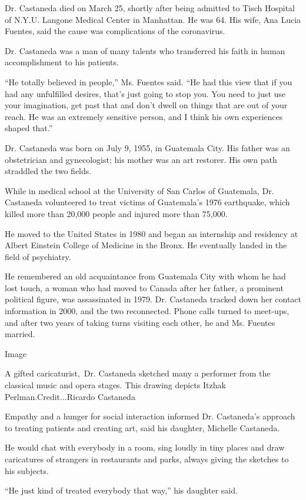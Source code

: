 Dr. Castaneda died on March 25, shortly after being admitted to Tisch
Hospital of N.Y.U. Langone Medical Center in Manhattan. He was 64. His
wife, Ana Lucia Fuentes, said the cause was complications of the
coronavirus.

Dr. Castaneda was a man of many talents who transferred his faith in
human accomplishment to his patients.

``He totally believed in people,'' Ms. Fuentes said. ``He had this view
that if you had any unfulfilled desires, that's just going to stop you.
You need to just use your imagination, get past that and don't dwell on
things that are out of your reach. He was an extremely sensitive person,
and I think his own experiences shaped that.''

Dr. Castaneda was born on July 9, 1955, in Guatemala City. His father
was an obstetrician and gynecologist; his mother was an art restorer.
His own path straddled the two fields.

While in medical school at the University of San Carlos of Guatemala,
Dr. Castaneda volunteered to treat victims of Guatemala's 1976
earthquake, which killed more than 20,000 people and injured more than
75,000.

He moved to the United States in 1980 and began an internship and
residency at Albert Einstein College of Medicine in the Bronx. He
eventually landed in the field of psychiatry.

He remembered an old acquaintance from Guatemala City with whom he had
lost touch, a woman who had moved to Canada after her father, a
prominent political figure, was assassinated in 1979. Dr. Castaneda
tracked down her contact information in 2000, and the two reconnected.
Phone calls turned to meet-ups, and after two years of taking turns
visiting each other, he and Ms. Fuentes married.

Image

A gifted caricaturist,~Dr. Castaneda sketched many a performer from the
classical music and opera stages. This drawing depicts Itzhak
Perlman.Credit...Ricardo Castaneda

Empathy and a hunger for social interaction informed Dr. Castaneda's
approach to treating patients and creating art, said his daughter,
Michelle Castaneda.

He would chat with everybody in a room, sing loudly in tiny places and
draw caricatures of strangers in restaurants and parks, always giving
the sketches to his subjects.

``He just kind of treated everybody that way,'' his daughter said.

